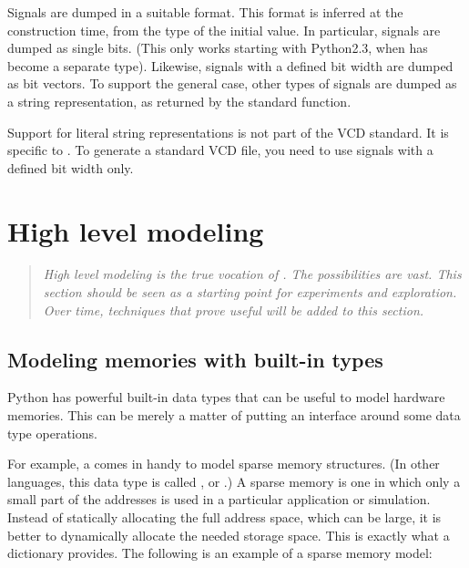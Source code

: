 Signals are dumped in a suitable format. This format is inferred at
the  construction time, from the type of the initial
value. In particular,  signals are dumped as single
bits. (This only works starting with Python2.3, when  has
become a separate type).  Likewise,  signals with a
defined bit width are dumped as bit vectors. To support the general
case, other types of signals are dumped as a string representation, as
returned by the standard  function.

\begin{notice}[warning]
Support for literal string representations is not part of the VCD
standard. It is specific to . To generate a
standard VCD file, you need to use signals with a defined bit width
only.
\end{notice}


\section{High level modeling \label{model-hl}}

\begin{quote}
\em 
High level modeling is the true vocation of \myhdl{}.  The
possibilities are vast.  This section should be seen as a starting
point for experiments and exploration. Over time, techniques that
prove useful will be added to this section.
\end{quote}

\subsection{Modeling memories with built-in types \label{model-mem}}

Python has powerful built-in data types that can be useful to model
hardware memories. This can be merely a matter of putting an interface
around some data type operations.

For example, a  comes in handy to model sparse memory
structures. (In other languages, this data type is called 
, or .) A sparse memory is one in
which only a small part of the addresses is used in a particular
application or simulation. Instead of statically allocating the full
address space, which can be large, it is better to dynamically
allocate the needed storage space. This is exactly what a dictionary
provides. The following is an example of a sparse memory model:

